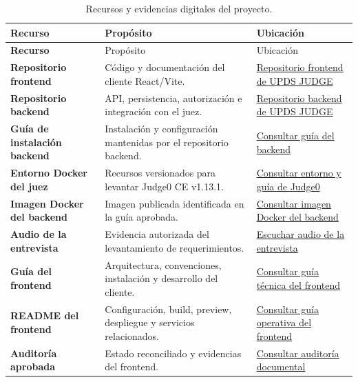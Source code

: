 \documentclass[11pt,a4paper]{article}
\begin{document}
\clearpage
\begin{longtable}{>{\bfseries}p{3.5cm}p{6.0cm}p{5.2cm}}
\caption{Recursos y evidencias digitales del proyecto.}\label{tab:recursos-digitales}\\
\toprule
Recurso & Propósito & Ubicación \\
\midrule
\endfirsthead
\toprule
Recurso & Propósito & Ubicación \\
\midrule
\endhead
Repositorio frontend & Código y documentación del cliente React/Vite. & \href{https://github.com/Alex-Fernandez-2003/UPDS-JUDGE-FRONT}{Repositorio frontend de UPDS JUDGE} \\
Repositorio backend & API, persistencia, autorización e integración con el juez. & \href{https://github.com/wilsonyucra413-sys/UPDSjudge}{Repositorio backend de UPDS JUDGE} \\
Guía de instalación backend & Instalación y configuración mantenidas por el repositorio backend. & \href{https://github.com/wilsonyucra413-sys/UPDSjudge\#readme}{Consultar guía del backend} \\
Entorno Docker del juez & Recursos versionados para levantar Judge0 CE v1.13.1. & \href{https://github.com/judge0/judge0/tree/v1.13.1}{Consultar entorno y guía de Judge0} \\
Imagen Docker del backend & Imagen publicada identificada en la guía aprobada. & \href{https://hub.docker.com/r/wilson53510/updsjudge-backend}{Consultar imagen Docker del backend} \\
Audio de la entrevista & Evidencia autorizada del levantamiento de requerimientos. & \href{https://drive.google.com/file/d/11f3wTCXvLU2kvgIwGbDxx9W_j6ErCma9/view?usp=drivesdk}{Escuchar audio de la entrevista} \\
Guía del frontend & Arquitectura, convenciones, instalación y desarrollo del cliente. & \href{https://github.com/Alex-Fernandez-2003/UPDS-JUDGE-FRONT/blob/develop/frontend/docs/guia-arquitectura-y-desarrollo.md}{Consultar guía técnica del frontend} \\
README del frontend & Configuración, build, preview, despliegue y servicios relacionados. & \href{https://github.com/Alex-Fernandez-2003/UPDS-JUDGE-FRONT/blob/develop/README.md}{Consultar guía operativa del frontend} \\
Auditoría aprobada & Estado reconciliado y evidencias del frontend. & \href{https://github.com/Alex-Fernandez-2003/UPDS-JUDGE-FRONT/blob/develop/docs/auditorias/auditoria-documentacion-frontend-estado-actual.md}{Consultar auditoría documental} \\
\bottomrule
\end{longtable}
\end{document}
